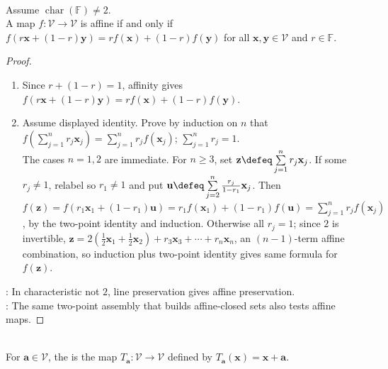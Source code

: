\begin{theorem} \label{thm:affine-map-two-point-test} \\
Assume $\operatorname{char}(\mathbb{F})\neq2$.\\
A map $f:\mathcal{V}\to\mathcal{V}$ is affine if and only if $f(r\mathbf{x}+(1-r)\mathbf{y})=r f(\mathbf{x})+(1-r)f(\mathbf{y})$ for all $\mathbf{x},\mathbf{y}\in\mathcal{V}$ and $r\in\mathbb{F}$.
\begin{proof}
\begin{enumerate}[label=\roman*.]
\setlength{\itemsep}{0pt}
\item[$(\Rightarrow)$] Since $r+(1-r)=1$, affinity gives $f(r\mathbf{x}+(1-r)\mathbf{y})=r f(\mathbf{x})+(1-r)f(\mathbf{y})$.
\item[$(\Leftarrow)$] Assume displayed identity. Prove by induction on $n$ that $f\left(\sum\limits_{j=1}^n r_j\mathbf{x}_j\right)=\sum\limits_{j=1}^n r_j f(\mathbf{x}_j)$; $\sum\limits_{j=1}^n r_j=1$.\\
The cases $n=1,2$ are immediate. For $n\geq3$, set $\mathbf{z}\defeq\sum\limits_{j=1}^n r_j\mathbf{x}_j$. If some $r_j\neq1$, relabel so $r_1\neq1$ and put $\mathbf{u}\defeq\sum\limits_{j=2}^n\frac{r_j}{1-r_1}\mathbf{x}_j$. Then $f(\mathbf{z}) =f(r_1\mathbf{x}_1+(1-r_1)\mathbf{u}) =r_1f(\mathbf{x}_1)+(1-r_1)f(\mathbf{u}) =\sum\limits_{j=1}^n r_j f(\mathbf{x}_j)$, by the two-point identity and induction. Otherwise all $r_j=1$; since $2$ is invertible, $\mathbf{z} =2\left(\frac12\mathbf{x}_1+\frac12\mathbf{x}_2\right)+r_3\mathbf{x}_3+\cdots+r_n\mathbf{x}_n$, an $(n-1)$-term affine combination, so induction plus two-point identity gives same formula for $f(\mathbf{z})$.
\end{enumerate}
: In characteristic not $2$, line preservation gives affine preservation.\\
: The same two-point assembly that builds affine-closed sets also tests affine maps.
\end{proof}
\end{theorem}

\begin{definition} \label{def:translation-map} \\
For $\mathbf{a}\in\mathcal{V}$, the  is the map $T_{\mathbf{a}}:\mathcal{V}\to\mathcal{V}$ defined by $T_{\mathbf{a}}(\mathbf{x})=\mathbf{x}+\mathbf{a}$.
\end{definition}

